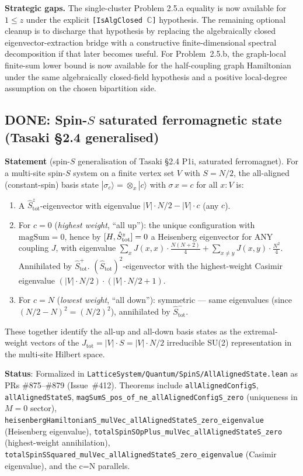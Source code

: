 \documentclass[a4paper,11pt]{article}
\begin{document}
\textbf{Strategic gaps.} The single-cluster Problem 2.5.a equality is now
available for \(1\le z\) under the explicit
\texttt{[IsAlgClosed \(\mathbb C\)]} hypothesis.  The remaining optional
cleanup is to discharge that hypothesis by replacing the algebraically closed
eigenvector-extraction bridge with a constructive finite-dimensional spectral
decomposition if that later becomes useful.  For Problem~2.5.b, the graph-local
finite-sum lower bound is now available for the half-coupling graph Hamiltonian
under the same algebraically closed-field hypothesis and a positive local-degree
assumption on the chosen bipartition side.

\subsection*{DONE: Spin-$S$ saturated ferromagnetic state (Tasaki §2.4 generalised)}
\label{subsec:spin-s-all-aligned}

\textbf{Statement} (spin-$S$ generalisation of Tasaki §2.4 P1i,
saturated ferromagnet). For a multi-site spin-$S$ system on a finite
vertex set $V$ with $S = N/2$, the all-aligned (constant-spin) basis
state $|\sigma_{\!c}\rangle = \otimes_x |c\rangle$ with
$\sigma\,x = c$ for all $x : V$ is:
\begin{enumerate}
\item A $\hat S^z_{\mathrm{tot}}$-eigenvector with eigenvalue
  $|V|\cdot N/2 - |V|\cdot c$ (any $c$).
\item For $c = 0$ (\emph{highest weight}, ``all up''): the unique
  configuration with $\mathrm{magSum} = 0$, hence by
  $[H,\hat S^z_{\rm tot}] = 0$ a Heisenberg eigenvector for ANY
  coupling $J$, with eigenvalue
  $\sum_x J(x,x)\cdot \tfrac{N(N+2)}{4} +
   \sum_{x\neq y} J(x,y)\cdot \tfrac{N^2}{4}$. Annihilated by
  $\hat S^+_{\mathrm{tot}}$.
  $(\hat S_{\mathrm{tot}})^2$-eigenvector with the highest-weight
  Casimir eigenvalue
  $(|V|\cdot N/2)\cdot(|V|\cdot N/2 + 1)$.
\item For $c = N$ (\emph{lowest weight}, ``all down''): symmetric —
  same eigenvalues (since $(N/2 - N)^2 = (N/2)^2$), annihilated by
  $\hat S^-_{\mathrm{tot}}$.
\end{enumerate}

These together identify the all-up and all-down basis states as the
extremal-weight vectors of the $J_{\mathrm{tot}} = |V|\cdot S
= |V|\cdot N/2$ irreducible SU(2) representation in the multi-site
Hilbert space.

\textbf{Status}: Formalized in
\texttt{LatticeSystem/Quantum/SpinS/AllAlignedState.lean} as PRs
\#875--\#879 (Issue~\#412). Theorems include
\texttt{allAlignedConfigS}, \texttt{allAlignedStateS},
\texttt{magSumS\_pos\_of\_ne\_allAlignedConfigS\_zero}
(uniqueness in $M=0$ sector),
\texttt{heisenbergHamiltonianS\_mulVec\_allAlignedStateS\_zero\_eigenvalue}
(Heisenberg eigenvalue),
\texttt{totalSpinSOpPlus\_mulVec\_allAlignedStateS\_zero}
(highest-weight annihilation),
\texttt{totalSpinSSquared\_mulVec\_allAlignedStateS\_zero\_eigenvalue}
(Casimir eigenvalue), and the c=N parallels.
\end{document}
